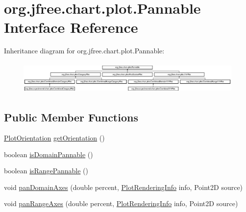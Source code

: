 \hypertarget{interfaceorg_1_1jfree_1_1chart_1_1plot_1_1_pannable}{}\section{org.\+jfree.\+chart.\+plot.\+Pannable Interface Reference}
\label{interfaceorg_1_1jfree_1_1chart_1_1plot_1_1_pannable}
Inheritance diagram for org.\+jfree.\+chart.\+plot.\+Pannable\+:\begin{figure}[H]
\begin{center}
\leavevmode
\includegraphics[height=1.676647cm]{interfaceorg_1_1jfree_1_1chart_1_1plot_1_1_pannable}
\end{center}
\end{figure}
\subsection*{Public Member Functions}
\begin{DoxyCompactItemize}
\item 
\mbox{\hyperlink{classorg_1_1jfree_1_1chart_1_1plot_1_1_plot_orientation}{Plot\+Orientation}} \mbox{\hyperlink{interfaceorg_1_1jfree_1_1chart_1_1plot_1_1_pannable_a09abf56f19f9173a9c1898ba03efdf8b}{get\+Orientation}} ()
\item 
boolean \mbox{\hyperlink{interfaceorg_1_1jfree_1_1chart_1_1plot_1_1_pannable_a732908d75e7c0b1fab688d9a29ff3e44}{is\+Domain\+Pannable}} ()
\item 
boolean \mbox{\hyperlink{interfaceorg_1_1jfree_1_1chart_1_1plot_1_1_pannable_ad1e4f1dde36baf9964ac14654aab4f8e}{is\+Range\+Pannable}} ()
\item 
void \mbox{\hyperlink{interfaceorg_1_1jfree_1_1chart_1_1plot_1_1_pannable_a263663aa22deafd5fc018dd3fe5d0c21}{pan\+Domain\+Axes}} (double percent, \mbox{\hyperlink{classorg_1_1jfree_1_1chart_1_1plot_1_1_plot_rendering_info}{Plot\+Rendering\+Info}} info, Point2D source)
\item 
void \mbox{\hyperlink{interfaceorg_1_1jfree_1_1chart_1_1plot_1_1_pannable_a76f01ef023f70b79c59f8c196ae19f73}{pan\+Range\+Axes}} (double percent, \mbox{\hyperlink{classorg_1_1jfree_1_1chart_1_1plot_1_1_plot_rendering_info}{Plot\+Rendering\+Info}} info, Point2D source)
\end{DoxyCompactItemize}


